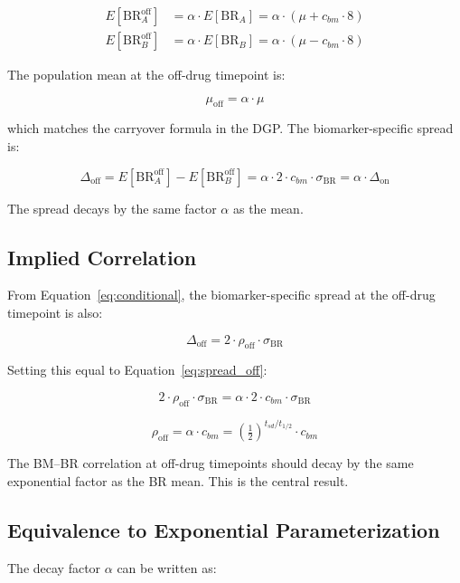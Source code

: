 \documentclass[11pt]{article}
\begin{document}
\begin{align}
E[\text{BR}_A^{\text{off}}] &= \alpha \cdot E[\text{BR}_A]
  = \alpha \cdot (\mu + c_{bm} \cdot 8) \\
E[\text{BR}_B^{\text{off}}] &= \alpha \cdot E[\text{BR}_B]
  = \alpha \cdot (\mu - c_{bm} \cdot 8)
\end{align}

The population mean at the off-drug timepoint is:

\[
\mu_{\text{off}} = \alpha \cdot \mu
\]

which matches the carryover formula in the DGP. The
biomarker-specific spread is:

\begin{equation}
\Delta_{\text{off}} = E[\text{BR}_A^{\text{off}}] -
  E[\text{BR}_B^{\text{off}}]
= \alpha \cdot 2 \cdot c_{bm} \cdot \sigma_{\text{BR}}
= \alpha \cdot \Delta_{\text{on}}
\label{eq:spread_off}
\end{equation}

The spread decays by the same factor $\alpha$ as the mean.

\subsection{Implied Correlation}

From Equation~\ref{eq:conditional}, the biomarker-specific
spread at the off-drug timepoint is also:

\[
\Delta_{\text{off}} = 2 \cdot \rho_{\text{off}} \cdot
  \sigma_{\text{BR}}
\]

Setting this equal to Equation~\ref{eq:spread_off}:

\[
2 \cdot \rho_{\text{off}} \cdot \sigma_{\text{BR}}
= \alpha \cdot 2 \cdot c_{bm} \cdot \sigma_{\text{BR}}
\]

\begin{equation}
\boxed{\rho_{\text{off}} = \alpha \cdot c_{bm}
= \left(\tfrac{1}{2}\right)^{t_{sd}/t_{1/2}} \cdot c_{bm}}
\label{eq:result}
\end{equation}

The BM--BR correlation at off-drug timepoints should decay by
the same exponential factor as the BR mean. This is the central
result.

\subsection{Equivalence to Exponential Parameterization}

The decay factor $\alpha$ can be written as:
\end{document}
